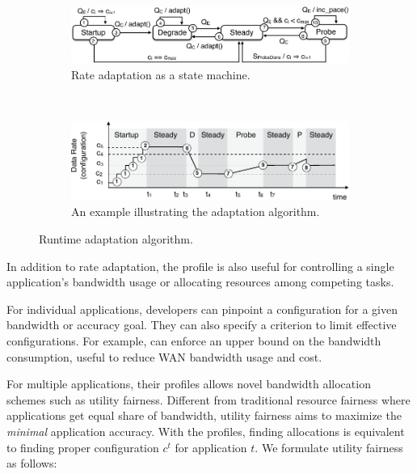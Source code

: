 \begin{figure}
  \begin{subfigure}[t]{\columnwidth}
    \centering
    \includegraphics[width=\columnwidth]{figures/cc.pdf}
    \caption{Rate adaptation as a state machine.}
    \vspace{1em}
    \label{fig:cc-sm}
  \end{subfigure}
  \\
  \centering
  \begin{subfigure}[t]{0.9\columnwidth}
    \centering
    \includegraphics[width=\columnwidth]{figures/cc2.pdf}
    \caption{An example illustrating the adaptation algorithm.}
    \label{fig:cc-ex}
  \end{subfigure}
  \caption{Runtime adaptation algorithm.}
  \label{fig:cc}
\end{figure}

%     

 In addition to rate adaptation, the
profile is also useful for controlling a single application's bandwidth usage or
allocating resources among competing tasks.

For individual applications, developers can pinpoint a configuration for a given
bandwidth or accuracy goal. They can also specify a criterion to limit effective
configurations. For example, \sysname{} can enforce an upper bound on the
bandwidth consumption, useful to reduce WAN bandwidth usage and cost.

For multiple applications, their profiles allows novel bandwidth allocation
schemes such as utility fairness. Different from traditional resource fairness
where applications get equal share of bandwidth, utility fairness aims
to maximize the \textit{minimal} application accuracy. With the profiles,
finding allocations is equivalent to finding proper configuration $c^t$ for
application $t$. We formulate utility fairness as follows:

